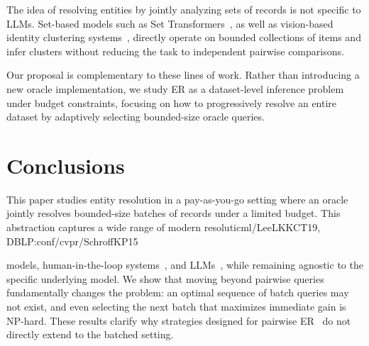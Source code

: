 \documentclass[sigconf, nonacm]{acmart}
\begin{document}
{The idea of resolving entities by jointly analyzing sets of records is not specific to LLMs.
Set-based models such as Set Transformers~\cite{DBLP:conf/icml/LeeLKKCT19}, as well as vision-based identity clustering systems~\cite{DBLP:conf/cvpr/SchroffKP15}, directly operate on bounded collections of items and infer clusters without reducing the task to independent pairwise comparisons.

Our proposal is complementary to these lines of work.
Rather than introducing a new oracle implementation, we study ER as a dataset-level inference problem under budget constraints, focusing on how to progressively resolve an entire dataset by adaptively selecting bounded-size oracle queries.


\section{Conclusions}\label{sec:conclusions}



This paper studies entity resolution in a pay-as-you-go setting where an oracle jointly resolves bounded-size batches of records under a limited budget. This abstraction captures a wide range of modern resoluticml/LeeLKKCT19, DBLP:conf/cvpr/SchroffKP15} models, human-in-the-loop systems~\cite{crowder, waldo}, and LLMs~\cite{DBLP:conf/coling/WangCLCHSWZ25}, while remaining agnostic to the specific underlying model. We show that moving beyond pairwise queries fundamentally changes the problem: an optimal sequence of batch queries may not exist, and even selecting the next batch that maximizes immediate gain is NP-hard. These results clarify why strategies designed for pairwise ER~\cite{firmani2016online} do not directly extend to the batched setting.
\end{document}

